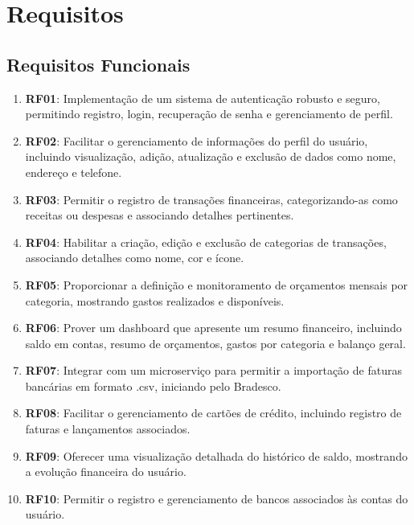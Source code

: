 \section{Requisitos}

\subsection{Requisitos Funcionais}
\begin{enumerate}
	\item \textbf{RF01}: Implementação de um sistema de autenticação robusto e seguro, permitindo registro, login, recuperação de senha e gerenciamento de perfil.
	\item \textbf{RF02}: Facilitar o gerenciamento de informações do perfil do usuário, incluindo visualização, adição, atualização e exclusão de dados como nome, endereço e telefone.
	\item \textbf{RF03}: Permitir o registro de transações financeiras, categorizando-as como receitas ou despesas e associando detalhes pertinentes.
	\item \textbf{RF04}: Habilitar a criação, edição e exclusão de categorias de transações, associando detalhes como nome, cor e ícone.
	\item \textbf{RF05}: Proporcionar a definição e monitoramento de orçamentos mensais por categoria, mostrando gastos realizados e disponíveis.
	\item \textbf{RF06}: Prover um dashboard que apresente um resumo financeiro, incluindo saldo em contas, resumo de orçamentos, gastos por categoria e balanço geral.
	\item \textbf{RF07}: Integrar com um microserviço para permitir a importação de faturas bancárias em formato .csv, iniciando pelo Bradesco.
	\item \textbf{RF08}: Facilitar o gerenciamento de cartões de crédito, incluindo registro de faturas e lançamentos associados.
	\item \textbf{RF09}: Oferecer uma visualização detalhada do histórico de saldo, mostrando a evolução financeira do usuário.
	\item \textbf{RF10}: Permitir o registro e gerenciamento de bancos associados às contas do usuário.
\end{enumerate}

